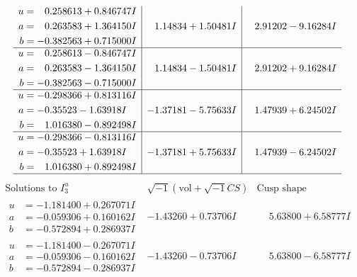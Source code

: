 \documentclass[1p]{elsarticle_modified}
\theoremstyle{definition}
\newcommand{\I}{\sqrt{-1}}
\begin{document}
$$\begin{array}{c|c|c}
\begin{aligned}
u &= \phantom{-}0.258613 + 0.846747 I \\
a &= \phantom{-}0.263583 + 1.364150 I \\
b &= -0.382563 + 0.715000 I\end{aligned}
 & \phantom{-}1.14834 + 1.50481 I & \phantom{-}2.91202 - 9.16284 I \\ \hline\begin{aligned}
u &= \phantom{-}0.258613 - 0.846747 I \\
a &= \phantom{-}0.263583 - 1.364150 I \\
b &= -0.382563 - 0.715000 I\end{aligned}
 & \phantom{-}1.14834 - 1.50481 I & \phantom{-}2.91202 + 9.16284 I \\ \hline\begin{aligned}
u &= -0.298366 + 0.813116 I \\
a &= -0.35523 - 1.63918 I \\
b &= \phantom{-}1.016380 - 0.892498 I\end{aligned}
 & -1.37181 - 5.75633 I & \phantom{-}1.47939 + 6.24502 I \\ \hline\begin{aligned}
u &= -0.298366 - 0.813116 I \\
a &= -0.35523 + 1.63918 I \\
b &= \phantom{-}1.016380 + 0.892498 I\end{aligned}
 & -1.37181 + 5.75633 I & \phantom{-}1.47939 - 6.24502 I\\
 \hline 
 \end{array}$$\newpage$$\begin{array}{c|c|c}  
\text{Solutions to }I^u_{3}& \I (\text{vol} + \sqrt{-1}CS) & \text{Cusp shape}\\
 \hline 
\begin{aligned}
u &= -1.181400 + 0.267071 I \\
a &= -0.059306 + 0.160162 I \\
b &= -0.572894 + 0.286937 I\end{aligned}
 & -1.43260 + 0.73706 I & \phantom{-}5.63800 + 6.58777 I \\ \hline\begin{aligned}
u &= -1.181400 - 0.267071 I \\
a &= -0.059306 - 0.160162 I \\
b &= -0.572894 - 0.286937 I\end{aligned}
 & -1.43260 - 0.73706 I & \phantom{-}5.63800 - 6.58777 I \\ \hline\begin{aligned}

\end{aligned}
\end{array}$$
\end{document}

